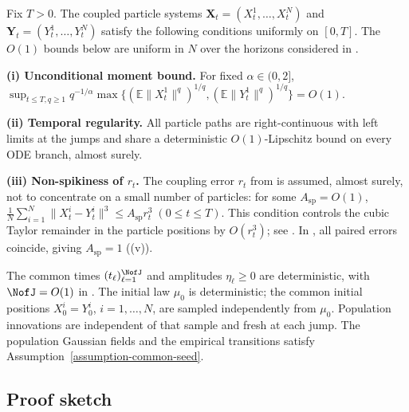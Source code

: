 \begin{assumption}
\label{assumption-main-coupled-particle-regularity}
Fix \(T>0\). The coupled particle systems
\(\mathbf X_t=(X_t^1,\dots,X_t^N)\) and
\(\mathbf Y_t=(Y_t^1,\dots,Y_t^N)\) satisfy the following conditions uniformly
on \([0,T]\). The \(O(1)\) bounds below are uniform in \(N\) over the
horizons considered in .

\begingroup\raggedright
\noindent
\textbf{(i) Unconditional moment bound.}
For fixed $\alpha\in(0,2]$,
\(\sup_{t\le T,q\ge1}q^{-1/\alpha}
\max\{(\mathbb E\|X_t^1\|^q)^{1/q},
       (\mathbb E\|Y_t^1\|^q)^{1/q}\}=O(1)\).\par
\endgroup

\noindent
\textbf{(ii) Temporal regularity.}
All particle paths are right-continuous with left limits at the jumps and
share a deterministic \(O(1)\)-Lipschitz bound on every ODE branch, almost surely.

\noindent
\textbf{(iii) Non-spikiness of $r_t$.}
The coupling error \(r_t\) from  is assumed,
almost surely, not to concentrate on a small number of particles: for some
\(A_{\mathrm{sp}} = O(1)\),
\(\frac1N\sum_{i=1}^N\|X_t^i-Y_t^i\|^3 \le A_{\mathrm{sp}} r_t^3\;
    (0\le t\le T)\).
This condition controls the cubic Taylor remainder in the particle positions by \(O(r_t^3)\);
see .
In , all paired errors coincide, giving
\(A_{\mathrm{sp}}=1\) ((v)).
\end{assumption}

\begin{assumption}
\label{assumption-main-jump-time}
The common times $(t_\ell)_{\ell=1}^{\NofJ}$ and amplitudes $\eta_\ell\ge0$
are deterministic, with $\NofJ=O(1)$ in .
The initial law \(\mu_0\) is deterministic; the common initial positions
\(X_0^i=Y_0^i\), \(i=1,\ldots,N\), are sampled independently from \(\mu_0\).
Population innovations are independent of that sample and fresh at each
jump. The population Gaussian fields and the empirical transitions satisfy
Assumption~\ref{assumption-common-seed}.
\end{assumption}

\subsection{Proof sketch}
\label{subsec:proof-sketch-after-assumptions}

